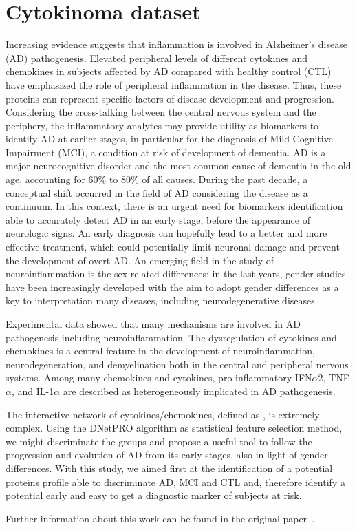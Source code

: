 \documentclass{standalone}
\begin{document}
\section[Cytokinoma Dataset]{Cytokinoma dataset}\label{cytokine:cytokine}

Increasing evidence suggests that inflammation is involved in Alzheimer's disease (AD) pathogenesis.
Elevated peripheral levels of different cytokines and chemokines in subjects affected by AD compared with healthy control (CTL) have emphasized the role of peripheral inflammation in the disease.
Thus, these proteins can represent specific factors of disease development and progression.
Considering the cross-talking between the central nervous system and the periphery, the inflammatory analytes may provide utility as biomarkers to identify AD at earlier stages, in particular for the diagnosis of Mild Cognitive Impairment (MCI), a condition at risk of development of dementia.
AD is a major neurocognitive disorder and the most common cause of dementia in the old age, accounting for 60\% to 80\% of all causes.
During the past decade, a conceptual shift occurred in the field of AD considering the disease as a continuum.
In this context, there is an urgent need for biomarkers identification able to accurately detect AD in an early stage, before the appearance of neurologic signs.
An early diagnosis can hopefully lead to a better and more effective treatment, which could potentially limit neuronal damage and prevent the development of overt AD.
An emerging field in the study of neuroinflammation is the sex-related differences: in the last years, gender studies have been increasingly developed with the aim to adopt gender differences as a key to interpretation many diseases, including neurodegenerative diseases.

Experimental data showed that many mechanisms are involved in AD pathogenesis including neuroinflammation.
The dysregulation of cytokines and chemokines is a central feature in the development of neuroinflammation, neurodegeneration, and demyelination both in the central and peripheral nervous systems.
Among many chemokines and cytokines, pro-inflammatory IFN$\alpha$2, TNF$\alpha$, and IL-1$\alpha$ are described as heterogeneously implicated in AD pathogenesis.

The interactive network of cytokines/chemokines, defined as , is extremely complex.
Using the DNetPRO algorithm as statistical feature selection method, we might discriminate the groups and propose a useful tool to follow the progression and evolution of AD from its early stages, also in light of gender differences.
With this study, we aimed first at the identification of a potential proteins profile able to discriminate AD, MCI and CTL and, therefore identify a potential early and easy to get a diagnostic marker of subjects at risk.

Further information about this work can be found in the original paper~\cite{Boccardi2019}.
\end{document}
